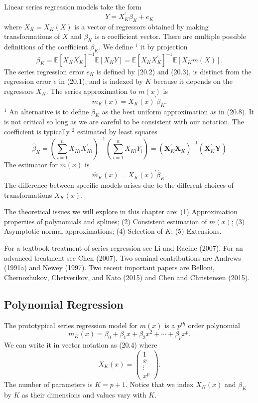 \documentclass[10pt]{article}
\begin{document}
Linear series regression models take the form
$$
Y=X_{K}^{\prime} \beta_{K}+e_{K}
$$
where $X_{K}=X_{K}(X)$ is a vector of regressors obtained by making transformations of $X$ and $\beta_{K}$ is a coefficient vector. There are multiple possible definitions of the coefficient $\beta_{K}$. We define ${ }^{1}$ it by projection
$$
\beta_{K}=\mathbb{E}\left[X_{K} X_{K}^{\prime}\right]^{-1} \mathbb{E}\left[X_{K} Y\right]=\mathbb{E}\left[X_{K} X_{K}^{\prime}\right]^{-1} \mathbb{E}\left[X_{K} m(X)\right] .
$$
The series regression error $e_{K}$ is defined by (20.2) and (20.3), is distinct from the regression error $e$ in (20.1), and is indexed by $K$ because it depends on the regressors $X_{K}$. The series approximation to $m(x)$ is
$$
m_{K}(x)=X_{K}(x)^{\prime} \beta_{K} .
$$
${ }^{1}$ An alternative is to define $\beta_{K}$ as the best uniform approximation as in (20.8). It is not critical so long as we are careful to be consistent with our notation. The coefficient is typically ${ }^{2}$ estimated by least squares
$$
\widehat{\beta}_{K}=\left(\sum_{i=1}^{n} X_{K i} X_{K i}^{\prime}\right)^{-1}\left(\sum_{i=1}^{n} X_{K i} Y_{i}\right)=\left(\boldsymbol{X}_{K}^{\prime} \boldsymbol{X}_{K}\right)^{-1}\left(\boldsymbol{X}_{K}^{\prime} \boldsymbol{Y}\right)
$$
The estimator for $m(x)$ is
$$
\widehat{m}_{K}(x)=X_{K}(x)^{\prime} \widehat{\beta}_{K} .
$$
The difference between specific models arises due to the different choices of transformations $X_{K}(x)$.

The theoretical issues we will explore in this chapter are: (1) Approximation properties of polynomials and splines; (2) Consistent estimation of $m(x)$; (3) Asymptotic normal approximations; (4) Selection of $K$; (5) Extensions.

For a textbook treatment of series regression see Li and Racine (2007). For an advanced treatment see Chen (2007). Two seminal contributions are Andrews (1991a) and Newey (1997). Two recent important papers are Belloni, Chernozhukov, Chetverikov, and Kato (2015) and Chen and Christensen (2015).

\subsection{Polynomial Regression}
The prototypical series regression model for $m(x)$ is a $p^{t h}$ order polynomial
$$
m_{K}(x)=\beta_{0}+\beta_{1} x+\beta_{2} x^{2}+\cdots+\beta_{p} x^{p} .
$$
We can write it in vector notation as (20.4) where
$$
X_{K}(x)=\left(\begin{array}{c}
1 \\
x \\
\vdots \\
x^{p}
\end{array}\right) .
$$
The number of parameters is $K=p+1$. Notice that we index $X_{K}(x)$ and $\beta_{K}$ by $K$ as their dimensions and values vary with $K$.
\end{document}
